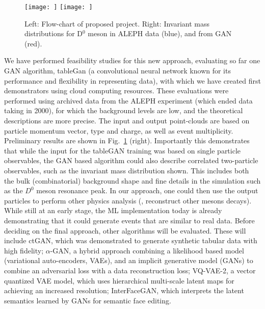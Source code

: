 
\begin{figure}[!ht]
\vspace{-0.4cm}
\begin{center}
\texttt{[image: ]}
\hspace{0.03\textwidth}
\texttt{[image: ]}
\vspace{-0.5cm}
\caption{Left: Flow-chart of proposed project. Right: Invariant mass distributions for D$^0$ meson in {\eecol} ALEPH data (blue), and from GAN (red).}
\label{fig:concept}
\end{center}
\end{figure}
\vspace{-0.8cm}

We have performed feasibility studies for this new approach, evaluating so far one GAN algorithm, tableGan (a convolutional neural network known for its performance and flexibility in representing data), with which we have created first demonstrators using cloud computing resources. These evaluations were performed using {\eecol} archived data from the ALEPH experiment (which ended data taking in 2000), for which the background levels are low, and the theoretical descriptions are more precise. The input and output point-clouds are based on particle momentum vector,  type and charge, as well as event multiplicity. Preliminary results are shown in Fig.~\ref{fig:concept} (right). Importantly this demonstrates that while the input for the tableGAN training was based on single particle observables, the GAN based algorithm could also describe correlated two-particle observables, such as the invariant mass distribution shown. This includes both the bulk (combinatorial) background shape and fine details in the simulation such as the $D^0$ meson resonance peak. In our approach, one could then use the output particles to perform other physics analysis (\eg, reconstruct other mesons decays). While still at an early stage, the ML implementation today is already demonstrating that it could generate {\eecol} events that are similar to real data. Before deciding on the final approach, other algorithms will be evaluated. These will include ctGAN, which was demonstrated to generate synthetic tabular data with high fidelity; $\alpha$-GAN, a hybrid approach combining a likelihood based model (variational auto-encoders, VAEs), and an implicit generative model (GANs) to combine an adversarial loss with a data reconstruction loss; VQ-VAE-2, a vector quantized VAE model, which uses hierarchical multi-scale latent maps for achieving an increased resolution; InterFaceGAN, which interprets the latent semantics learned by GANs for semantic face editing. 

